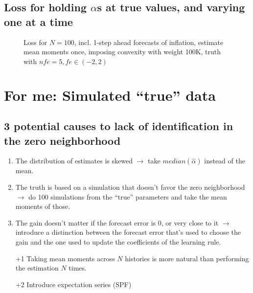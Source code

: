 \documentclass[11pt]{article}
\def \myFigPath {../../figures/}
\renewcommand{\[}{\begin{equation}}
\renewcommand{\]}{\end{equation}}
\newcommand\blankpage{%
    \null
    \thispagestyle{empty}%
    \addtocounter{page}{-1}%
    \newpage}
\begin{document}
\clearpage
\subsection{Loss for holding $\alpha$s at true values, and varying one at a time}

\begin{figure}[h!]
\caption{Loss for $N=100$, incl. 1-step ahead forecasts of inflation, estimate mean moments once, imposing convexity with weight 100K, truth with $nfe=5, fe \in(-2,2)$}
\end{figure}


\afterpage{\blankpage}

\newpage

\clearpage

\section{For me: Simulated ``true'' data}
\subsection*{3 potential causes to lack of identification in the zero neighborhood}
\begin{enumerate}
\item The distribution of estimates is skewed $\rightarrow$ take $median(\hat{\alpha})$ instead of the mean.
\item The truth is based on a simulation that doesn't favor the zero neighborhood $\rightarrow$ do 100 simulations from the ``true'' parameters and take the mean moments of those.
\item The gain doesn't matter if the forecast error is 0, or very close to it $\rightarrow$ introduce a distinction between the forecast error that's used to choose the gain and the one used to update the coefficients of the learning rule.
\item[+1] Taking mean moments across $N$ histories is more natural than performing the estimation $N$ times.
\item[+2] Introduce expectation series (SPF)
\end{enumerate}
\end{document}
